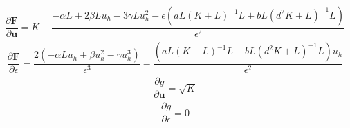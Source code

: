 \documentclass[a4paper, 11pt]{ltjsreport}
\theoremstyle{plain}
\theoremstyle{definition}
\begin{document}
\begin{align}
    \dfrac{\partial \bm{F}}{\partial \bm{u}} 
    = 
    K- \dfrac{-\alpha L + 2\beta  L u_h -3\gamma L u_h^2-\epsilon(aL(K+L)^{-1}L+bL(d^2K+L)^{-1}L) }{\epsilon^2}
\end{align}
\begin{align}
  \dfrac{\partial \bm{F}}{\partial \epsilon}
  =
  \dfrac{2(-\alpha L u_h + \beta  u_h^2 -\gamma  u_h^3)}{\epsilon^3}
  -\dfrac{(aL(K+L)^{-1}L+bL(d^2K+L)^{-1}L)u_h}{\epsilon^2}
\end{align}
\begin{align}
  \dfrac{\partial g}{\partial \bm{u}}= \sqrt{K}
\end{align}
\begin{align}
  \dfrac{\partial g}{\partial \epsilon}=0
\end{align}
\end{document}
